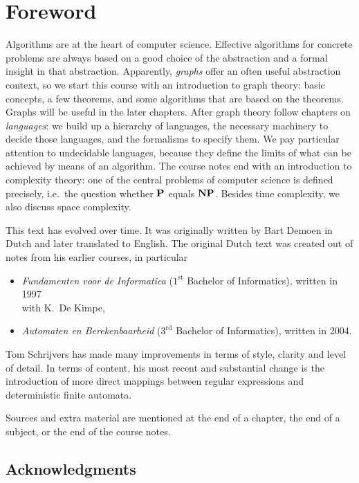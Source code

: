 \chapter*{Foreword}

Algorithms are at the heart of computer science. Effective algorithms
for concrete problems are always based on a good choice of the
abstraction and a formal insight in that abstraction. Apparently, {\em
graphs} offer an often useful abstraction context, so we start this
course with an introduction to graph theory: basic concepts, a few
theorems, and some algorithms that are based on the theorems. Graphs
will be useful in the later chapters. After graph theory follow
chapters on {\em languages}: we build up a hierarchy of languages,
the necessary machinery to decide those languages, and the formalisms
to specify them. We pay particular attention to undecidable
languages, because they define the limits of what can be achieved by
means of an algorithm. The course notes end with an introduction to
complexity theory: one of the central problems of computer science is
defined precisely, i.e.\ the question whether $\P$ equals
$\NP$. Besides time complexity, we also discuss space complexity.

This text has evolved over time. It was originally written by Bart Demoen in
Dutch and later translated to English. The original Dutch text was created out
of notes from his earlier courses, in particular
\begin{itemize}
\item {\em Fundamenten voor de Informatica} ($1^\text{st}$ Bachelor of
Informatics), written in 1997\\ with K.\ De Kimpe,
\item {\em Automaten en Berekenbaarheid} ($3^\text{rd}$ Bachelor of Informatics),
written in 2004.
\end{itemize}

Tom Schrijvers has made many improvements in terms of style, clarity and level
of detail. In terms of content, his most recent and substantial change is the
introduction of more direct mappings between regular expressions and
deterministic finite automata.

Sources and extra material are mentioned at the end of a chapter, the
end of a subject, or the end of the course notes.

\section*{Acknowledgments}

